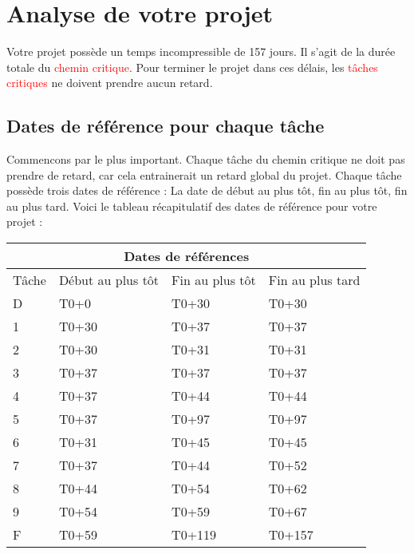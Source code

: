 \documentclass{article}
\begin{document}
\section{Analyse de votre projet}
Votre projet possède un temps incompressible de 157 jours.
    Il s'agit de la durée totale du \textcolor{red}{chemin critique}.
    Pour terminer le projet dans ces délais, les \textcolor{red}{tâches critiques} ne doivent prendre aucun retard.\subsection{Dates de référence pour chaque tâche}Commencons par le plus important. Chaque tâche du chemin critique ne doit pas prendre de
    retard, car cela entrainerait un retard global du projet.
    Chaque tâche possède trois dates de référence : La date de début au plus tôt,
    fin au plus tôt, fin au plus tard.
    Voici le tableau récapitulatif des dates de référence pour votre projet :\newline 
\begin{tabular}{ |p{3cm}||p{3cm}|p{3cm}|p{3cm}|  }
        \hline
        \multicolumn{4}{|c|}{Dates de références} \\
        \hline 
        Tâche&Début au plus tôt&Fin au plus tôt&Fin au plus tard \\ 
        \hline 
 D&T0+0&T0+30&T0+30 \\ 
 1&T0+30&T0+37&T0+37 \\ 
 2&T0+30&T0+31&T0+31 \\ 
 3&T0+37&T0+37&T0+37 \\ 
 4&T0+37&T0+44&T0+44 \\ 
 5&T0+37&T0+97&T0+97 \\ 
 6&T0+31&T0+45&T0+45 \\ 
 7&T0+37&T0+44&T0+52 \\ 
 8&T0+44&T0+54&T0+62 \\ 
 9&T0+54&T0+59&T0+67 \\ 
 F&T0+59&T0+119&T0+157 \\ 
\hline
    \end{tabular} 
\end{document}
